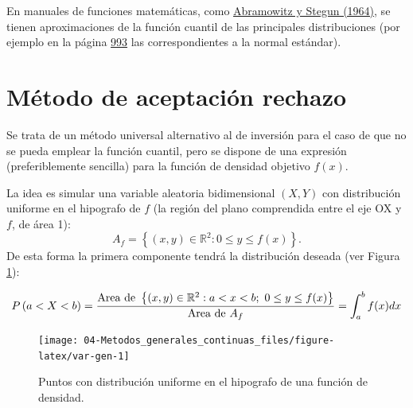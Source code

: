 \documentclass[
]{book}
\theoremstyle{break}
\theoremstyle{nonumberplain}
\begin{document}
En manuales de funciones matemáticas, como \href{https://www.math.ubc.ca/~cbm/aands/frameindex.htm}{Abramowitz y Stegun (1964)},
se tienen aproximaciones de la función cuantil de las principales distribuciones
(por ejemplo en la página \href{https://www.math.ubc.ca/~cbm/aands/page_933.htm}{993}
las correspondientes a la normal estándar).

\hypertarget{AR}{%
\section{Método de aceptación rechazo}\label{AR}}

Se trata de un método universal alternativo al de inversión para el caso de que no se pueda emplear la función cuantil, pero se dispone de una expresión (preferiblemente sencilla) para la función de densidad objetivo \(f\left( x \right)\).

La idea es simular una variable aleatoria bidimensional \(\left( X, Y\right)\) con distribución uniforme en el hipografo de \(f\) (la región del plano comprendida entre el eje OX y \(f\), de área 1):
\[A_{f}=\left\{ \left( x,y\right) \in \mathbb{R}^{2}:0\leq y\leq f(x) \right\}.\]
De esta forma la primera componente tendrá la distribución deseada (ver Figura \ref{fig:var-gen}):

\[ P\left( a<X<b\right) = \frac{\text{Area de }\left\{ \left( x,y\right) \in 
\mathbb{R}^{2}:a<x<b;~0\leq y\leq f(x) \right\} }{\text{Area de }
A_{f}} \\
= \int_{a}^{b}f(x) dx \]

\begin{figure}[!htb]

{\centering \texttt{[image: 04-Metodos\_generales\_continuas\_files/figure-latex/var-gen-1]} 

}

\caption{Puntos con distribución uniforme en el hipografo de una función de densidad.}\label{fig:var-gen}
\end{figure}
\end{document}
